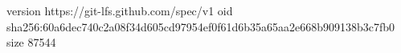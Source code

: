 version https://git-lfs.github.com/spec/v1
oid sha256:60a6dec740c2a08f34d605cd97954ef0f61d6b35a65aa2e668b909138b3c7fb0
size 87544
